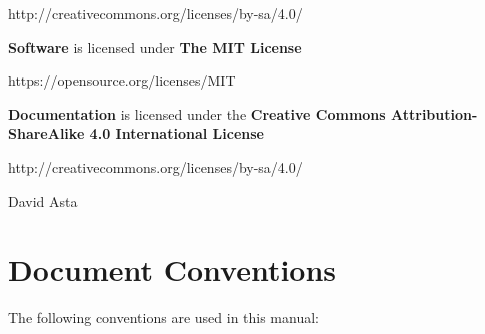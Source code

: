 \documentclass[a4paper,11pt]{article}
\begin{document}
    \hspace{1cm}http://creativecommons.org/licenses/by-sa/4.0/
    
    \textbf{Software} is licensed under \textbf{The MIT License}
    
    \hspace{1cm}https://opensource.org/licenses/MIT
    
    \textbf{Documentation} is licensed under the \textbf{Creative Commons
    Attribution-ShareAlike 4.0 International License}
    
    \hspace{1cm}http://creativecommons.org/licenses/by-sa/4.0/

    \normalsize

    \hrulefill

     David Asta

    \pagebreak
    \section*{Document Conventions}
    The following conventions are used in this manual:
\end{document}
